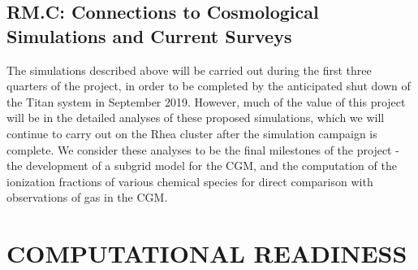 \documentclass[11pt,letterpaper,english]{article}
\begin{document}
\vspace{-.25in}
\subsection{RM.C: Connections to Cosmological Simulations and Current Surveys}
\vspace{-.2in}

The simulations described above will be carried out during the first three quarters of the project, in order to be completed by the anticipated shut down of the Titan system in September 2019. However, much of the value of this project will be in the detailed analyses of these proposed simulations, which we will continue to carry out on the Rhea cluster after the simulation campaign is complete. We consider these analyses to be the final milestones of the project - the development of a subgrid model for the CGM, and the computation of the ionization fractions of various chemical species for direct comparison with observations of gas in the CGM.


\vspace{-.25in}
\section{COMPUTATIONAL READINESS}
\vspace{-.2in}

\end{document}
